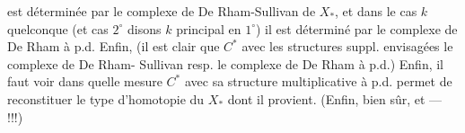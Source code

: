 est déterminée par le complexe de
De Rham-Sullivan de $X_*$, et dans
le cas $k$ quelconque (et cas $2^\circ$ disons
$k$ principal en  $1^\circ$) il est
déterminé par le complexe de
De Rham à p.d. Enfin,
 (il est clair que $C^*$
avec les structures suppl. envisagées
 le complexe de De Rham-
Sullivan resp. le complexe de
De Rham à p.d.) Enfin, il
faut voir dans quelle mesure $C^*$
avec sa structure multiplicative
à p.d. permet de reconstituer le
type d'homotopie du $X_*$ dont
il provient. (Enfin, bien sûr,
 et  --- !!!)
